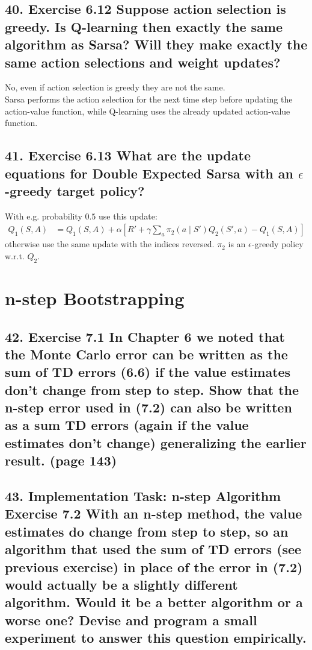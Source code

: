 \subsection*{40. Exercise 6.12 Suppose action selection is greedy. Is Q-learning then exactly the same algorithm as Sarsa? Will they make exactly the same action selections and weight updates?}
No, even if action selection is greedy they are not the same.\\
Sarsa performs the action selection for the next time step before updating the action-value function, while Q-learning uses the already updated action-value function.

\subsection*{41. Exercise 6.13 What are the update equations for Double Expected Sarsa with an $\epsilon$-greedy target policy?}
With e.g. probability $0.5$ use this update:
\begin{align*}
Q_1(S, A) &= Q_1(S, A) + \alpha [R' + \gamma \underset{a}{\sum}\pi_2(a \mid S') Q_2(S', a) - Q_1(S, A)]
\end{align*}
otherwise use the same update with the indices reversed. $\pi_2$ is an $\epsilon$-greedy policy w.r.t. $Q_2$.

\newpage
\section*{n-step Bootstrapping}
\subsection*{42. Exercise 7.1 In Chapter 6 we noted that the Monte Carlo error can be written as the sum of TD errors (6.6) if the value estimates don't change from step to step. Show that the n-step error used in (7.2) can also be written as a sum TD errors (again if the value estimates don't change) generalizing the earlier result. (page 143)}

\subsection*{43. Implementation Task: n-step Algorithm Exercise 7.2 With an n-step method, the value estimates do change from step to step, so an algorithm that used the sum of TD errors (see previous exercise) in place of the error in (7.2) would actually be a slightly different algorithm. Would it be a better algorithm or a worse one? Devise and program a small experiment to answer this question empirically.}

